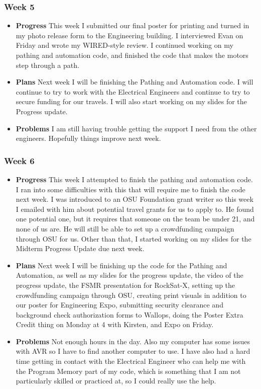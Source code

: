 \subsubsection{Week 5}
\begin{itemize}
\item{
\textbf{Progress}
This week I submitted our final poster for printing and turned in my photo release form to the Engineering building. I interviewed Evan on Friday and wrote my WIRED-style review. I continued working on my pathing and automation code, and finished the code that makes the motors step through a path.
}
\item{
\textbf{Plans}
Next week I will be finishing the Pathing and Automation code. I will continue to try to work with the Electrical Engineers and continue to try to secure funding for our travels. I will also start working on my slides for the Progress update.
}
\item{
\textbf{Problems}
I am still having trouble getting the support I need from the other engineers. Hopefully things improve next week.
}
\end{itemize}

\subsubsection{Week 6}
\begin{itemize}
\item{
\textbf{Progress}
This week I attempted to finish the pathing and automation code. I ran into some difficulties with this that will require me to finish the code next week. I was introduced to an OSU Foundation grant writer so this week I emailed with him about potential travel grants for us to apply to. He found one potential one, but it requires that someone on the team be under 21, and none of us are. He will still be able to set up a crowdfunding campaign through OSU for us. Other than that, I started working on my slides for the Midterm Progress Update due next week.
}
\item{
\textbf{Plans}
Next week I will be finishing up the code for the Pathing and Automation, as well as my slides for the progress update, the video of the progress update, the FSMR presentation for RockSat-X, setting up the crowdfunding campaign through OSU, creating print visuals in addition to our poster for Engineering Expo, submitting security clearance and background check authorization forms to Wallops, doing the Poster Extra Credit thing on Monday at 4 with Kirsten, and Expo on Friday.
}
\item{
\textbf{Problems}
Not enough hours in the day. Also my computer has some issues with AVR so I have to find another computer to use. I have also had a hard time getting in contact with the Electrical Engineer who can help me with the Program Memory part of my code, which is something that I am not particularly skilled or practiced at, so I could really use the help.
}
\end{itemize}

